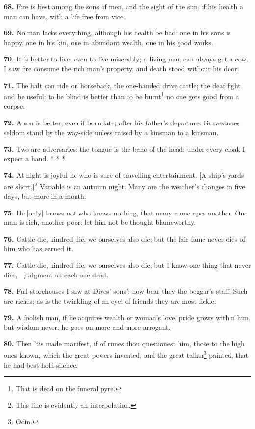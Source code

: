 \textbf{68.} Fire is best among the sons of men, and the sight of the sun, if
his health a man can have, with a life free from vice.

\textbf{69.} No man lacks everything, although his health be bad: one in his
sons is happy, one in his kin, one in abundant wealth, one in his good
works.

\textbf{70.} It is better to live, even to live miserably; a living man can
always get a cow. I saw fire consume the rich man's property, and
death stood without his door.

\textbf{71.} The halt can ride on horseback, the one-handed drive cattle; the
deaf fight and be useful: to be blind is better than to be burnt\footnote{That is dead on the funeral pyre.}
no one gets good from a corpse.

\textbf{72.} A son is better, even if born late, after his father's
departure. Gravestones seldom stand by the way-side unless raised by a
kinsman to a kinsman.

\textbf{73.} Two are adversaries: the tongue is the bane of the head: under
every cloak I expect a hand. * * *

\textbf{74.} At night is joyful he who is sure of travelling entertainment.
[A ship's yards are short.]\footnote{This line is evidently an interpolation.} Variable is an autumn night. Many are
the weather's changes in five days, but more in a month.

\textbf{75.} He [only] knows not who knows nothing, that many a one apes
another. One man is rich, another poor: let him not be thought
blameworthy.

\textbf{76.} Cattle die, kindred die, we ourselves also die; but the fair
fame never dies of him who has earned it.

\textbf{77.} Cattle die, kindred die, we ourselves also die; but I know one
thing that never dies,—judgment on each one dead.

\textbf{78.} Full storehouses I saw at Dives' sons': now bear they the
beggar's staff. Such are riches; as is the twinkling of an eye: of
friends they are most fickle.

\textbf{79.} A foolish man, if he acquires wealth or woman's love, pride
grows within him, but wisdom never: he goes on more and more arrogant.

\textbf{80.} Then 'tis made manifest, if of runes thou questionest him, those
to the high ones known, which the great powers invented, and the
great talker\footnote{Odin.} painted, that he had best hold silence.

